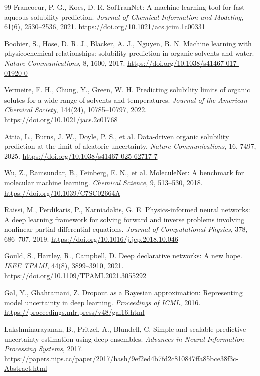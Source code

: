 \documentclass[11pt]{article}
\theoremstyle{definition}
\begin{document}
\begin{thebibliography}{99}
 Francoeur, P. G., Koes, D. R. SolTranNet: A machine learning tool for fast aqueous solubility prediction. \textit{Journal of Chemical Information and Modeling}, 61(6), 2530--2536, 2021. \url{https://doi.org/10.1021/acs.jcim.1c00331}

 Boobier, S., Hose, D. R. J., Blacker, A. J., Nguyen, B. N. Machine learning with physicochemical relationships: solubility prediction in organic solvents and water. \textit{Nature Communications}, 8, 1600, 2017. \url{https://doi.org/10.1038/s41467-017-01920-0}

 Vermeire, F. H., Chung, Y., Green, W. H. Predicting solubility limits of organic solutes for a wide range of solvents and temperatures. \textit{Journal of the American Chemical Society}, 144(24), 10785--10797, 2022. \url{https://doi.org/10.1021/jacs.2c01768}

 Attia, L., Burns, J. W., Doyle, P. S., et al. Data-driven organic solubility prediction at the limit of aleatoric uncertainty. \textit{Nature Communications}, 16, 7497, 2025. \url{https://doi.org/10.1038/s41467-025-62717-7}

 Wu, Z., Ramsundar, B., Feinberg, E. N., et al. MoleculeNet: A benchmark for molecular machine learning. \textit{Chemical Science}, 9, 513--530, 2018. \url{https://doi.org/10.1039/C7SC02664A}

 Raissi, M., Perdikaris, P., Karniadakis, G. E. Physics-informed neural networks: A deep learning framework for solving forward and inverse problems involving nonlinear partial differential equations. \textit{Journal of Computational Physics}, 378, 686--707, 2019. \url{https://doi.org/10.1016/j.jcp.2018.10.046}

 Gould, S., Hartley, R., Campbell, D. Deep declarative networks: A new hope. \textit{IEEE TPAMI}, 44(8), 3899--3910, 2021. \url{https://doi.org/10.1109/TPAMI.2021.3055292}

 Gal, Y., Ghahramani, Z. Dropout as a Bayesian approximation: Representing model uncertainty in deep learning. \textit{Proceedings of ICML}, 2016. \url{https://proceedings.mlr.press/v48/gal16.html}

 Lakshminarayanan, B., Pritzel, A., Blundell, C. Simple and scalable predictive uncertainty estimation using deep ensembles. \textit{Advances in Neural Information Processing Systems}, 2017. \url{https://papers.nips.cc/paper/2017/hash/9ef2ed4b7fd2c810847ffa85bce38f3c-Abstract.html}


\end{thebibliography}
\end{document}
